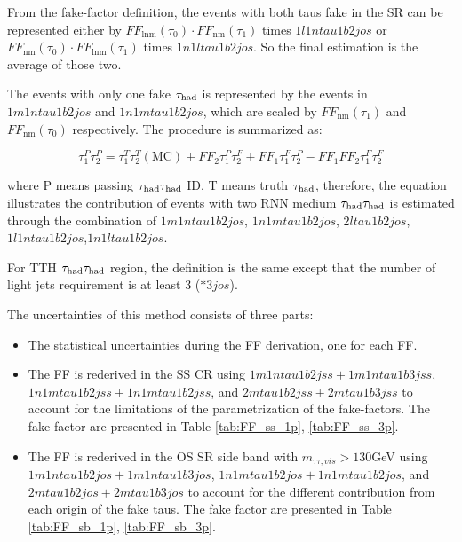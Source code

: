 From the fake-factor definition, the events with both taus fake in the SR can be represented either by $F F_{\operatorname{lnm}}\left(\tau_{0}\right) \cdot F F_{\mathrm{nm}}\left(\tau_{1}\right)$ times $1l1ntau1b2jos$ or $F F_{\mathrm{nm}}\left(\tau_{0}\right) \cdot F F_{\mathrm{lnm}}\left(\tau_{1}\right)$ times $1n1ltau1b2jos$. So the final estimation is the average of those two.

The events with only one fake $\tau_\text{had}$ is represented by the events in $1m1ntau1b2jos$ and $1n1mtau1b2jos$, which are scaled by $F F_{\mathrm{nm}}\left(\tau_{1}\right)$ and $F F_{\mathrm{nm}}\left(\tau_{0}\right)$ respectively. The procedure is summarized as:

\begin{equation}
\tau_{1}^{P} \tau_{2}^{P}=\tau_{1}^{T} \tau_{2}^{T}(\mathrm{MC})+F F_{2} \tau_{1}^{P} \tau_{2}^{F}+F F_{1} \tau_{1}^{F} \tau_{2}^{P}-F F_{1} F F_{2} \tau_{1}^{F} \tau_{2}^{F}
\end{equation}

where P means passing $\tau_\text{had}{}\tau_\text{had}$ ID, T means truth $\tau_\text{had}$, therefore, the equation illustrates the contribution of events with two RNN medium $\tau_\text{had}{}\tau_\text{had}$ is estimated through the combination of $1m1ntau1b2jos$, $1n1mtau1b2jos$, $2ltau1b2jos$,$1l1ntau1b2jos$,$1n1ltau1b2jos$.

For TTH $\tau_\text{had}{}\tau_\text{had}$ region, the definition is the same except that the number of light jets requirement is at least 3 ($*3jos$). 

The uncertainties of this method consists of three parts:
\begin{itemize}

\item The statistical uncertainties during the FF derivation, one for each FF.

\item The FF is rederived in the SS CR using $1m1ntau1b2jss+1m1ntau1b3jss$, $1n1mtau1b2jss+1n1mtau1b2jss$, and $2mtau1b2jss+2mtau1b3jss$ to account for the limitations of the parametrization of the fake-factors. The fake factor are presented in Table \ref{tab:FF_ss_1p}, \ref{tab:FF_ss_3p}.

\item The FF is rederived in the OS SR side band with $m_{\tau\tau,vis}>130$GeV using $1m1ntau1b2jos+1m1ntau1b3jos$, $1n1mtau1b2jos+1n1mtau1b2jos$, and $2mtau1b2jos+2mtau1b3jos$ to account for the different contribution from each origin of the fake taus. The fake factor are presented in Table \ref{tab:FF_sb_1p},  \ref{tab:FF_sb_3p}.

\end{itemize}

